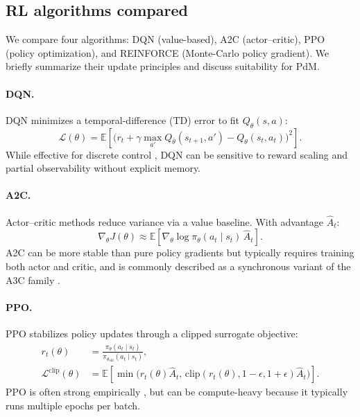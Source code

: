 \documentclass[11pt]{article}
\begin{document}
\subsection{RL algorithms compared}
\label{sec:algos}
We compare four algorithms: DQN (value-based), A2C (actor--critic), PPO (policy optimization), and REINFORCE (Monte-Carlo policy gradient). We briefly summarize their update principles and discuss suitability for PdM.

\paragraph{DQN.}
DQN minimizes a temporal-difference (TD) error to fit $Q_\theta(s,a)$:
\begin{equation}
	\mathcal{L}(\theta)=\mathbb{E}\left[\big(r_t + \gamma\max_{a'}Q_{\bar\theta}(s_{t+1},a') - Q_\theta(s_t,a_t)\big)^2\right].
\end{equation}
While effective for discrete control \parencite{Mnih2015DQN}, DQN can be sensitive to reward scaling and partial observability without explicit memory.

\paragraph{A2C.}
Actor--critic methods reduce variance via a value baseline. With advantage $\hat{A}_t$:
\begin{equation}
	\nabla_\theta J(\theta) \approx \mathbb{E}[\nabla_\theta \log \pi_\theta(a_t\mid s_t)\,\hat{A}_t].
\end{equation}
A2C can be more stable than pure policy gradients but typically requires training both actor and critic, and is commonly described as a synchronous variant of the A3C family \parencite{Mnih2016A3C}.

\paragraph{PPO.}
PPO stabilizes policy updates through a clipped surrogate objective:
\begin{align}
	r_t(\theta) &= \frac{\pi_\theta(a_t\mid s_t)}{\pi_{\theta_{\text{old}}}(a_t\mid s_t)},\\
	\mathcal{L}^{\text{clip}}(\theta) &= \mathbb{E}\left[\min\big(r_t(\theta)\hat{A}_t,\,\mathrm{clip}(r_t(\theta),1-\epsilon,1+\epsilon)\hat{A}_t\big)\right].
\end{align}
PPO is often strong empirically \parencite{Schulman2017PPO}, but can be compute-heavy because it typically runs multiple epochs per batch.
\end{document}
